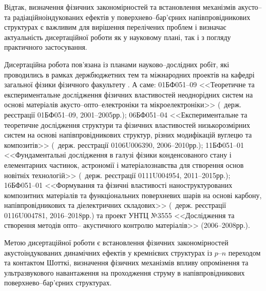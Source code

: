 Відтак,  визначення фізичних  закономірностей  та встановлення механізмів акусто-- та радіаційноіндукованих
ефектів у поверхнево--бар'єрних напівпровідникових структурах  є  важливим  для  вирішення  перелічених  проблем  і визначає актуальність дисертаційної роботи як у науковому плані, так і з погляду практичного застосування.


{\InterconnectionTXT}
Дисертаційна робота  пов’язана із планами науково--дослідних робіт, які проводились в рамках
держбюджетних тем та міжнародних проектів на кафедрі загальної фізики фізичного факультету \thesisOfOrganization.
А саме:
\textnumero01БФ051--09 <<Теоретичне та експериментальне дослідження фізичних властивостей неоднорідних систем на основі матеріалів акусто--опто--електроніки та мікроелектроніки>>
(\textnumero~держ. реєстрації 01БФ051--09, 2001--2005рр.);
\textnumero06БФ051--04 <<Експериментальне та теоретичне дослідження структури та фізичних властивостей низькорозмірних систем на основі напівпровідникових структур, різних модифікацій вуглецю та композитів>>
(\textnumero~держ. реєстрації 0106U006390, 2006--2010рр.);
\textnumero11БФ051--01 <<Фундаментальні дослідження в галузі фізики конденсованого стану і елементарних частинок, астрономії і матеріалознавства для створення основ новітніх технологій>>
(\textnumero~держ. реєстрації 0111U004954, 2011--2015рр.);
\textnumero16БФ051--01 <<Формування та фізичні властивості наноструктурованих композитних матеріалів та функціональних поверхневих шарів на основі карбону, напівпровідникових та діелектричних складових>>
(\textnumero~держ. реєстрації  0116U004781, 2016--2018рр.) та
проект УНТЦ №3555 <<Дослідження та створення методів опто-- акустичного контролю матеріалів>> (2006--2008рр.).

{\AimAndTasksTXT}
Метою дисертаційної роботи є
встановлення фізичних закономірностей акустоіндукованих динамічних ефектів у кремнієвих структурах із $p$--$n$ переходом та контактом Шотткі,
визначення фізичних механізмів впливу опромінення та ультразвукового навантаження на проходження струму в напівпровідникових поверхнево--бар'єрних структурах.

